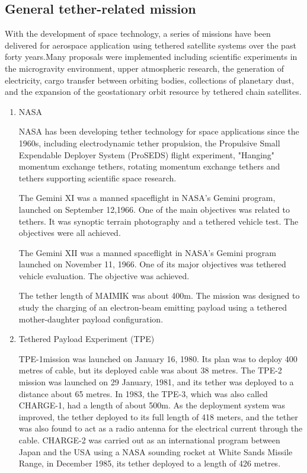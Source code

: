 \subsection{General tether-related mission}
With the development of space technology, a series of missions\cite{cartmell2008review,van2009space,carroll1995tethers,carroll1985guidebook,johnson1999overview,carroll2002space,klinkrad2006space} have been delivered for aerospace application using tethered satellite systems over the past forty years.Many proposals were implemented including scientific experiments in the microgravity environment, upper atmospheric research, the generation of electricity, cargo transfer between orbiting bodies, collections of planetary dust, and the expansion of
the geostationary orbit resource by tethered chain satellites.
\begin{enumerate} 
\item{NASA}
 
NASA has been developing tether technology for space applications since the 1960s, including electrodynamic tether propulsion, the Propulsive Small Expendable Deployer System (ProSEDS) flight experiment, "Hanging" momentum exchange tethers, rotating momentum exchange tethers and tethers supporting scientific space research. 

The Gemini XI was a manned spaceflight in NASA's Gemini program, launched on September 12,1966. One of the main objectives was related to tethers. It was synoptic terrain photography and a tethered vehicle test. The objectives were all achieved. 

The Gemini XII was a manned spaceflight in NASA's Gemini program launched on November 11, 1966. One of its major objectives was tethered vehicle evaluation. The objective was achieved.

The tether length of MAIMIK was about 400m. The mission was designed to study the charging of an electron-beam emitting payload using a tethered mother-daughter payload configuration. 
\item{Tethered Payload Experiment (TPE)}

TPE-1mission was launched on January 16, 1980. Its plan was to deploy 400 metres of cable, but its deployed cable was about 38 metres. The TPE-2 mission was launched on 29 January, 1981, and its tether was deployed to a distance about 65 metres. In 1983, the TPE-3, which was also called CHARGE-1, had a length of about 500m. As the deployment system was improved, the tether deployed to its full length of 418 meters, and the tether was also found to act as a radio antenna for the electrical current through the cable. CHARGE-2 was carried out as an international program between Japan and the USA using a NASA sounding rocket at White Sands Missile Range, in December 1985, its tether deployed to a length of 426 metres.


\end{enumerate}

